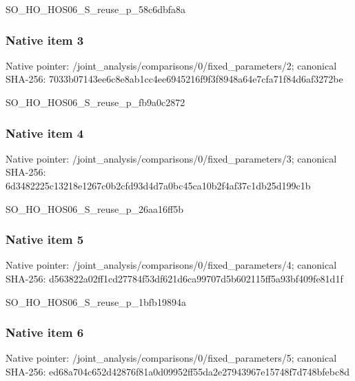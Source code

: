 \documentclass[10pt,a4paper]{article}
\begin{document}
\begingroup\raggedright\sloppy SO\_\allowbreak{}HO\_\allowbreak{}HOS06\_\allowbreak{}S\_\allowbreak{}reuse\_\allowbreak{}p\_\allowbreak{}58c6dbfa8a\par\endgroup

\subsubsection{Native item 3}
Native pointer: /joint\_\allowbreak{}analysis/comparisons/0/fixed\_\allowbreak{}parameters/2; canonical SHA-256: 7033b07143ee6c8e8ab1cc4ee6945216f9f3f8948a64e7cfa71f84d6af3272be

\begingroup\raggedright\sloppy SO\_\allowbreak{}HO\_\allowbreak{}HOS06\_\allowbreak{}S\_\allowbreak{}reuse\_\allowbreak{}p\_\allowbreak{}fb9a0c2872\par\endgroup

\subsubsection{Native item 4}
Native pointer: /joint\_\allowbreak{}analysis/comparisons/0/fixed\_\allowbreak{}parameters/3; canonical SHA-256: 6d3482225c13218e1267c0b2cfd93d4d7a0bc45ca10b2f4af37c1db25d199c1b

\begingroup\raggedright\sloppy SO\_\allowbreak{}HO\_\allowbreak{}HOS06\_\allowbreak{}S\_\allowbreak{}reuse\_\allowbreak{}p\_\allowbreak{}26aa16ff5b\par\endgroup

\subsubsection{Native item 5}
Native pointer: /joint\_\allowbreak{}analysis/comparisons/0/fixed\_\allowbreak{}parameters/4; canonical SHA-256: d563822a02ff1cd27784f53df621d6ca99707d5b602115ff5a93bf409fe81d1f

\begingroup\raggedright\sloppy SO\_\allowbreak{}HO\_\allowbreak{}HOS06\_\allowbreak{}S\_\allowbreak{}reuse\_\allowbreak{}p\_\allowbreak{}1bfb19894a\par\endgroup

\subsubsection{Native item 6}
Native pointer: /joint\_\allowbreak{}analysis/comparisons/0/fixed\_\allowbreak{}parameters/5; canonical SHA-256: ed68a704c652d42876f81a0d09952ff55da2e27943967e15748f7d748bfebc8d
\end{document}
